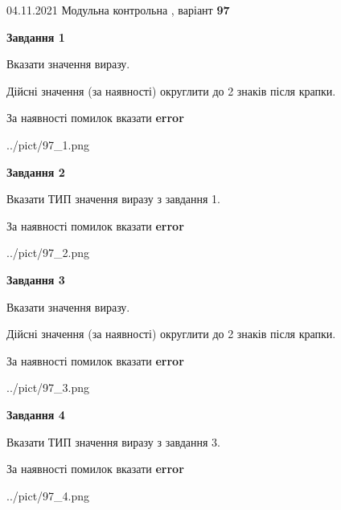 \documentclass[11pt, ukrainian]{article}
\begin{document}
{04.11.2021 Модульна контрольна , варіант  \No \textbf { 97 }\par}
{
\begin {large}
{\begin {center}\textbf{Завдання 1}\end {center}}\par
Вказати значення виразу. \par
Дійсні значення (за наявності) округлити до 2 знаків після крапки. \par
За наявності помилок вказати \textbf{error}

\begin{center}
	{../pict/97_1.png}
\end{center}
\newpage

{\begin {center}\textbf{Завдання 2}\end {center}}\par
Вказати ТИП значення виразу з завдання 1. \par
За наявності помилок вказати \textbf{error}

\begin{center}
	{../pict/97_2.png}
\end{center}
\newpage

{\begin {center}\textbf{Завдання 3}\end {center}}\par
Вказати значення виразу. \par
Дійсні значення (за наявності) округлити до 2 знаків після крапки. \par
За наявності помилок вказати \textbf{error}

\begin{center}
	{../pict/97_3.png}
\end{center}
\newpage

{\begin {center}\textbf{Завдання 4}\end {center}}\par
Вказати ТИП значення виразу з завдання 3. \par
За наявності помилок вказати \textbf{error}

\begin{center}
	{../pict/97_4.png}
\end{center}
\newpage


\end{large}}
\end{document}

